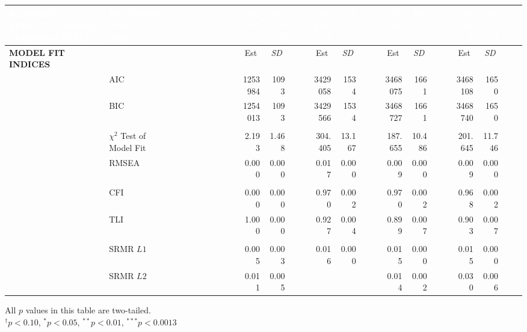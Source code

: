 {\begin{tabular}{l @{\hskip -7.9cm} l c rr @{\hskip -0.1mm}l rr @{\hskip -0.1mm}l rr @{\hskip -0.1mm}l rr @{\hskip -0.1mm}l}
      \textcolor{white}{\textbf{RANDOM EFFECTS} (residual variances of FLIT)} & \textcolor{white}{IMMI2GEN (total indirect)} & \textcolor{white}{$\gamma_4+\gamma_{41}\beta_1+\gamma_{42}\beta_2$} & \textcolor{white}{6121.904} & \textcolor{white}{131.192}  & \textcolor{white}{$^{***}$} & \textcolor{white}{7866.408} & \textcolor{white}{114.555}  & \textcolor{white}{$^{***}$} & \textcolor{white}{5763.677} & \textcolor{white}{130.133}  & \textcolor{white}{$^{***}$} & \textcolor{white}{5763.690} & \textcolor{white}{130.133}  & \textcolor{white}{$^{***}$} \\
      \midrule
      \textbf{MODEL FIT INDICES} &       &       & \multicolumn{1}{c}{Est} & \multicolumn{1}{c}{\textit{SD}} &       & \multicolumn{1}{c}{Est} & \multicolumn{1}{c}{\textit{SD}} &       & \multicolumn{1}{c}{Est} & \multicolumn{1}{c}{\textit{SD}} &       & \multicolumn{1}{c}{Est} & \multicolumn{1}{c}{\textit{SD}} &  \\
      \cmidrule{4-5}\cmidrule{7-8}\cmidrule{10-11}\cmidrule{13-14}          & AIC   &       & 1253984 & 1093  &       & 3429058 & 1534  &       & 3468075 & 1661  &       & 3468108 & 1650  &  \\
      & BIC   &       & 1254013 & 1093  &       & 3429566 & 1534  &       & 3468727 & 1661  &       & 3468740 & 1650  &  \\
      &&&&&&&&&&&&&&\\
      & $\chi^2$ Test of Model Fit &       & 2.193 & 1.468 &       & 304.405 & 13.167 &       & 187.655 & 10.486 &       & 201.645 & 11.746 &  \\
      & RMSEA &       & 0.000 & 0.000 &       & 0.017 & 0.000 &       & 0.009 & 0.000 &       & 0.009 & 0.000 &  \\
      &&&&&&&&&&&&&&\\
      & CFI   &       & 0.000 & 0.000 &       & 0.970 & 0.002 &       & 0.970 & 0.002 &       & 0.968 & 0.002 &  \\
      & TLI   &       & 1.000 & 0.000 &       & 0.927 & 0.004 &       & 0.899 & 0.007 &       & 0.903 & 0.007 &  \\
      &&&&&&&&&&&&&&\\
      & SRMR $L1$ &       & 0.005 & 0.003 &       & 0.016 & 0.000 &       & 0.015 & 0.000 &       & 0.015 & 0.000 &  \\
      & SRMR $L2$ &       & 0.011 & 0.005 &       &       &       &       & 0.014 & 0.002 &       & 0.030 & 0.006 &  \\
        \bottomrule
    \end{tabular}
}{All $p$ values in this table are two-tailed. \\
$^\dagger p < 0.10$, $^* p < 0.05$, $^{**} p < 0.01$, $^{***} p < 0.001$}{3}
